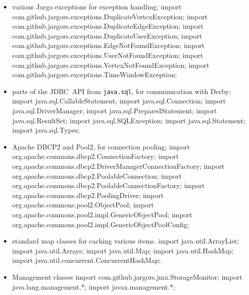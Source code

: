 \begin{itemize}
\item various Jargo exceptions for exception handling;
\nwenddocs{}\plusendmoddef
import com.github.jargors.exceptions.DuplicateVertexException;
import com.github.jargors.exceptions.DuplicateEdgeException;
import com.github.jargors.exceptions.DuplicateUserException;
import com.github.jargors.exceptions.EdgeNotFoundException;
import com.github.jargors.exceptions.UserNotFoundException;
import com.github.jargors.exceptions.VertexNotFoundException;
import com.github.jargors.exceptions.TimeWindowException;
\nwendcode{}\item parts of the JDBC~API from {\tt{}java.sql}, for communication with Derby;
\nwenddocs{}\plusendmoddef
import java.sql.CallableStatement;   import java.sql.Connection;
import java.sql.DriverManager;       import java.sql.PreparedStatement;
import java.sql.ResultSet;           import java.sql.SQLException;
import java.sql.Statement;           import java.sql.Types;
\nwendcode{}\item Apache DBCP2 and Pool2, for connection pooling;
\nwenddocs{}\plusendmoddef
import org.apache.commons.dbcp2.ConnectionFactory;
import org.apache.commons.dbcp2.DriverManagerConnectionFactory;
import org.apache.commons.dbcp2.PoolableConnection;
import org.apache.commons.dbcp2.PoolableConnectionFactory;
import org.apache.commons.dbcp2.PoolingDriver;
import org.apache.commons.pool2.ObjectPool;
import org.apache.commons.pool2.impl.GenericObjectPool;
import org.apache.commons.pool2.impl.GenericObjectPoolConfig;
\nwendcode{}\item standard map classes for caching various items.
\nwenddocs{}\plusendmoddef
import java.util.ArrayList;
import java.util.Arrays;
import java.util.Map;
import java.util.HashMap;
import java.util.concurrent.ConcurrentHashMap;
\nwendcode{}\item Management classes
\nwenddocs{}\plusendmoddef
import com.github.jargors.jmx.StorageMonitor;
import java.lang.management.*;
import javax.management.*;
\nwendcode{}\nwdocspar
\end{itemize}

